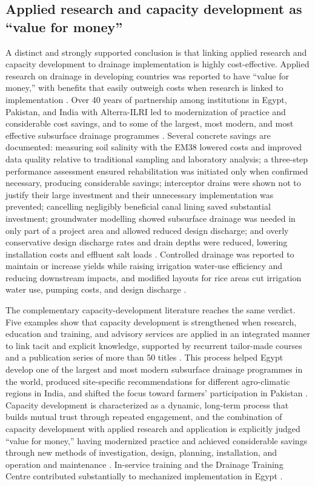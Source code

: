\documentclass[11pt]{article}
\begin{document}
\subsection{Applied research and capacity development as ``value for money''}
A distinct and strongly supported conclusion is that linking applied research and capacity development to drainage implementation is highly cost-effective. Applied research on drainage in developing countries was reported to have ``value for money,'' with benefits that easily outweigh costs when research is linked to implementation \parencite{Ritzema2007}. Over 40 years of partnership among institutions in Egypt, Pakistan, and India with Alterra-ILRI led to modernization of practice and considerable cost savings, and to some of the largest, most modern, and most effective subsurface drainage programmes \parencite{Ritzema2007}. Several concrete savings are documented: measuring soil salinity with the EM38 lowered costs and improved data quality relative to traditional sampling and laboratory analysis; a three-step performance assessment ensured rehabilitation was initiated only when confirmed necessary, producing considerable savings; interceptor drains were shown not to justify their large investment and their unnecessary implementation was prevented; cancelling negligibly beneficial canal lining saved substantial investment; groundwater modelling showed subsurface drainage was needed in only part of a project area and allowed reduced design discharge; and overly conservative design discharge rates and drain depths were reduced, lowering installation costs and effluent salt loads \parencite{Ritzema2007}. Controlled drainage was reported to maintain or increase yields while raising irrigation water-use efficiency and reducing downstream impacts, and modified layouts for rice areas cut irrigation water use, pumping costs, and design discharge \parencite{Ritzema2007}.

The complementary capacity-development literature reaches the same verdict. Five examples show that capacity development is strengthened when research, education and training, and advisory services are applied in an integrated manner to link tacit and explicit knowledge, supported by recurrent tailor-made courses and a publication series of more than 50 titles \parencite{Ritzema2008}. This process helped Egypt develop one of the largest and most modern subsurface drainage programmes in the world, produced site-specific recommendations for different agro-climatic regions in India, and shifted the focus toward farmers' participation in Pakistan \parencite{Ritzema2008,Ritzema2006}. Capacity development is characterized as a dynamic, long-term process that builds mutual trust through repeated engagement, and the combination of capacity development with applied research and application is explicitly judged ``value for money,'' having modernized practice and achieved considerable savings through new methods of investigation, design, planning, installation, and operation and maintenance \parencite{Ritzema2008}. In-service training and the Drainage Training Centre contributed substantially to mechanized implementation in Egypt \parencite{Ritzema2006}.
\end{document}
